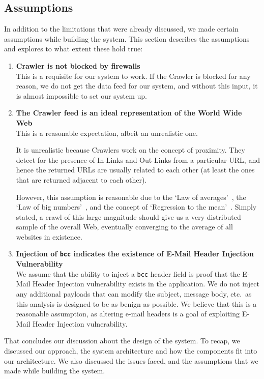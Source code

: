 \subsection{Assumptions}
In addition to the limitations that were already discussed, we made certain assumptions while building the system. This section describes the assumptions and explores to what extent these hold true:
\begin{enumerate}
	\item \textbf{Crawler is not blocked by firewalls}\\
	This is a requisite for our system to work. If the Crawler is blocked for any reason, we do not get the data feed for our system, and without this input, it is almost impossible to set our system up.
	
	\item \textbf{The Crawler feed is an ideal representation of the World Wide Web} \\
	This is a reasonable expectation, albeit an unrealistic one.
	
	It is unrealistic because Crawlers work on the concept of proximity. They detect for the presence of In-Links and Out-Links from a particular URL, and hence the returned URLs are usually related to each other (at least the ones that are returned adjacent to each other).
	
	However, this assumption is reasonable due to the `Law of averages'~\cite{wiki:Law_of_averages}, the `Law of big numbers'~\cite{wiki:Law_of_large_numbers}, and the concept of `Regression to the mean'~\cite{wiki:Regression_toward_the_mean}. Simply stated, a crawl of this large magnitude should give us a very distributed sample of the overall Web, eventually converging to the average of all websites in existence.
	
	\item \textbf{Injection of \texttt{bcc} indicates the existence of E-Mail Header Injection Vulnerability} \\
	We assume that the ability to inject a \texttt{bcc} header field is proof that the E-Mail Header Injection vulnerability exists in the application. We do not inject any additional payloads that can modify the subject, message body, etc.\ as this analysis is designed to be as benign as possible.
	We believe that this is a reasonable assumption, as altering e-mail headers is a goal of exploiting E-Mail Header Injection vulnerability.
\end{enumerate}

That concludes our discussion about the design of the system. To recap, we discussed our approach, the system architecture and how the components fit into our architecture. We also discussed the issues faced, and the assumptions that we made while building the system. %